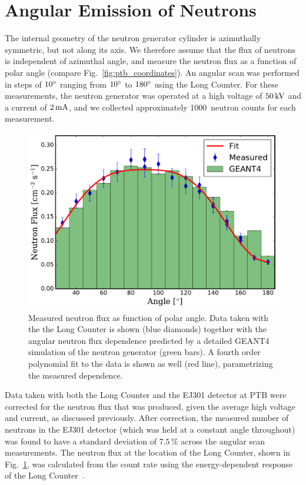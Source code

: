 \section{Angular Emission of Neutrons}\label{sec:angular}

The internal geometry of the neutron generator cylinder is azimuthally symmetric, but not along its axis. We therefore assume that the flux of neutrons is independent of azimuthal angle, and measure the neutron flux as a function of polar angle (compare Fig.~\ref{fig:ptb_coordinates}). An angular scan was performed in steps of $10{}^{\circ}$ ranging from $10{}^{\circ}$ to $180{}^{\circ}$ using the Long Counter. For these measurements, the neutron generator was operated at a high voltage of $50\,\mathrm{kV}$ and a current of $2\,\mathrm{mA}$, and we collected approximately 1000~neutron counts for each measurement.

\begin{figure}[!htbp]
\centering
    \includegraphics[width=\columnwidth]{figures/ng/fig_angle_scan}
    \caption{Measured neutron flux as function of polar angle. Data taken with the the Long Counter is shown (blue diamonds) together with the angular neutron flux dependence predicted by a detailed GEANT4 simulation of the neutron generator (green bars). A fourth order polynomial fit to the data is shown as well (red line), parametrizing the measured dependence.}
    \label{Fig:Angle_Scan_Match}
\end{figure}

Data taken with both the Long Counter and the EJ301 detector at PTB were corrected for the neutron flux that was produced, given the average high voltage and current, as discussed previously. After correction, the measured number of neutrons in the EJ301 detector (which was held at a constant angle throughout) was found to have a standard deviation of $7.5\,\%$ across the angular scan measurements. The neutron flux at the location of the Long Counter, shown in Fig.~\ref{Fig:Angle_Scan_Match}, was calculated from the count rate using the energy-dependent response of the Long Counter~\cite{Roberts:2004}.

